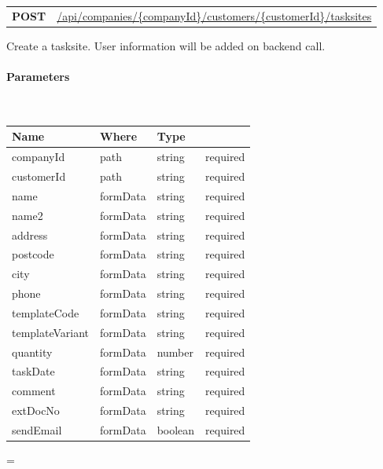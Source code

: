 \documentclass[10pt]{article}
\newcommand{\method}[2]{
    \begin{mdframed}[style=#1]
        \color{white}
        \begin{tabularx}{\textwidth}{lX}
            \MakeUppercase{\textbf{#1}} & #2 \\
        \end{tabularx}
    \end{mdframed}
}
\newenvironment{absolutelynopagebreak}
  {\par\nobreak\vfil\penalty0\vfilneg
   \vtop\bgroup}
  {\par\xdef\tpd{\the\prevdepth}\egroup
   \prevdepth=\tpd}
\begin{document}
            \vspace{.5cm}
            \begin{absolutelynopagebreak}
                \label{route:386920d48d660f5c73e0b9e0f01c7492}
                \method{post}{\url{/api/companies/{companyId}/customers/{customerId}/tasksites}}

                \begin{flushleft}
                    Create a tasksite. User information will be added on backend call.
                    \vspace{.25cm}

                    \paragraph{Parameters}\mbox{}\\
                    \vspace{.25cm}
                    \begin{tabularx}{\textwidth}{lXlr}
                        \textbf{Name} & \textbf{Where} & \textbf{Type} \\
                        \hline
                            companyId & path & string & required \\
                            customerId & path & string & required \\
                            name & formData & string & required \\
                            name2 & formData & string & required \\
                            address & formData & string & required \\
                            postcode & formData & string & required \\
                            city & formData & string & required \\
                            phone & formData & string & required \\
                            templateCode & formData & string & required \\
                            templateVariant & formData & string & required \\
                            quantity & formData & number & required \\
                            taskDate & formData & string & required \\
                            comment & formData & string & required \\
                            extDocNo & formData & string & required \\
                            sendEmail & formData & boolean & required \\
                    \end{tabularx}


\end{flushleft}
\end{absolutelynopagebreak}
\end{document}
